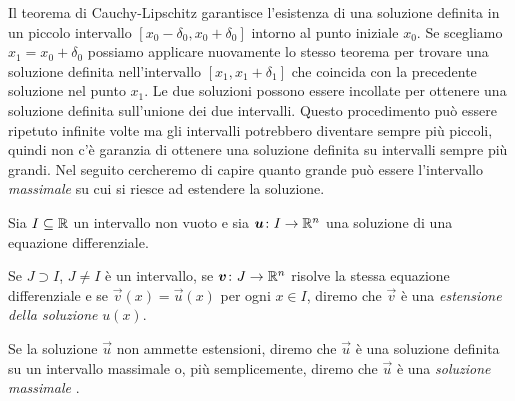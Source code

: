 Il teorema di Cauchy-Lipschitz garantisce l'esistenza di una soluzione
definita in un
piccolo intervallo $[x_0-\delta_0, x_0+\delta_0]$ intorno al punto iniziale $x_0$.
Se scegliamo $x_1 = x_0+\delta_0$ possiamo applicare nuovamente lo stesso
teorema per trovare una soluzione definita nell'intervallo
$[x_1, x_1+\delta_1]$
che coincida con la precedente soluzione nel punto $x_1$.
Le due soluzioni possono
essere incollate per ottenere una soluzione definita sull'unione dei due intervalli.
Questo procedimento può essere ripetuto infinite volte ma gli intervalli
potrebbero diventare sempre più piccoli, quindi non c'è garanzia di ottenere una
soluzione definita su intervalli sempre più grandi.
Nel seguito cercheremo di capire quanto grande può essere l'intervallo
\emph{massimale} su cui si riesce ad estendere la soluzione.

\begin{definition}
Sia $I\subseteq {\mathbb R}$ un intervallo non vuoto e sia $\boldsymbol u \colon I \to {\mathbb R}^n$
una soluzione di una equazione differenziale.

Se $J\supset I$, $J \neq I$ è un intervallo, se $\boldsymbol v\colon J \to {\mathbb R}^n$
risolve la stessa equazione differenziale
e se $\vec v(x)=\vec u(x)$ per ogni $x\in I$,
diremo che $\vec v$ è una \emph{estensione della soluzione}%
 $u(x)$.

Se la soluzione $\vec u$ non ammette estensioni, diremo che $\vec u$ è una
soluzione definita su un intervallo massimale o, più semplicemente, diremo
che $\vec u$ è una \emph{soluzione massimale}%
.
\end{definition}


